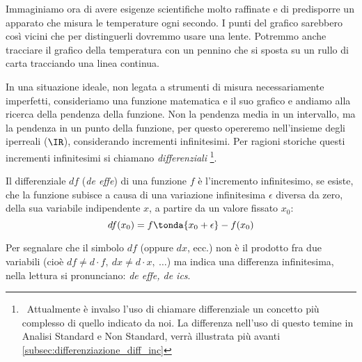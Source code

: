 Immaginiamo ora di avere esigenze scientifiche molto raffinate e di 
predisporre un apparato che misura le temperature ogni secondo. 
I punti del grafico sarebbero così vicini che per distinguerli dovremmo 
usare una lente.
Potremmo anche tracciare il grafico della temperatura con un pennino che si 
sposta su un rullo di carta tracciando una linea continua.


In una situazione ideale, non legata a strumenti di misura necessariamente 
imperfetti, consideriamo una funzione matematica e il suo grafico e andiamo 
alla ricerca della pendenza della funzione.
Non la pendenza media in un intervallo, ma la pendenza in un 
punto della funzione, per questo opereremo nell'insieme degli 
iperreali (\(\IR\)), 
considerando incrementi infinitesimi. 
Per ragioni storiche questi incrementi infinitesimi si chiamano 
\emph{differenziali} \footnote{~Attualmente è invalso l'uso di chiamare 
differenziale un concetto più complesso di quello indicato da noi. 
La differenza nell'uso di questo temine in Analisi Standard e Non Standard, 
verrà illustrata più avanti \ref{subsec:differenziazione_diff_inc}}.
\begin{definizione}
Il differenziale 
\(df\) (\emph{de effe}) di una funzione \(f\) è 
l'incremento infinitesimo, se esiste, 
che la funzione subisce a causa di una variazione infinitesima 
\(\epsilon\) diversa da zero, della sua variabile indipendente \(x\), 
a partire da un valore fissato \(x_0\):
\[df(x_0) = f \tonda{x_0 + \epsilon} - f(x_0)\]
\end{definizione}

\begin{osservazione}
Per segnalare che il simbolo \(df\) (oppure \(dx\), ecc.) non è il prodotto 
fra due variabili 
(cioè \(df \ne d \cdot f,\ dx \ne d\cdot x,\ \dots\)) ma indica 
una differenza infinitesima, nella lettura si pronunciano:
\textit{de effe, de ics}.
\end{osservazione}

